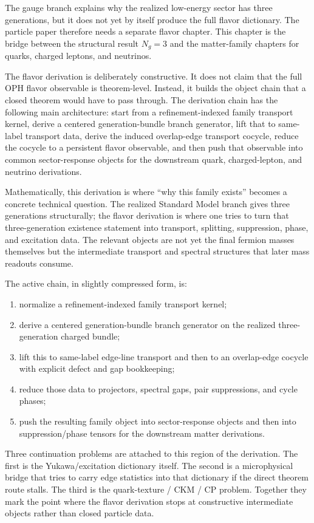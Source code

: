 \documentclass[11pt]{article}
\begin{document}
The gauge branch explains why the realized low-energy sector has three generations, but it does
not yet by itself produce the full flavor dictionary. The particle paper therefore needs a
separate flavor chapter. This chapter is the bridge between the structural result \(N_g=3\) and
the matter-family chapters for quarks, charged leptons, and neutrinos.

The flavor derivation is deliberately constructive. It does not claim that the full
OPH flavor observable is theorem-level. Instead, it builds the object chain that a
closed theorem would have to pass through. The derivation chain has the following main
architecture: start from a refinement-indexed family transport kernel, derive a centered
generation-bundle branch generator, lift that to same-label transport data, derive the induced
overlap-edge transport cocycle, reduce the cocycle to a persistent flavor observable, and then
push that observable into common sector-response objects for the downstream quark, charged-lepton,
and neutrino derivations.

Mathematically, this derivation is where ``why this family exists'' becomes a concrete technical
question. The realized Standard Model branch gives three generations structurally; the flavor
derivation is where one tries to turn that three-generation existence statement into transport,
splitting, suppression, phase, and excitation data. The relevant objects are not yet the final
fermion masses themselves but the intermediate transport and spectral structures that later mass
readouts consume.

The active chain, in slightly compressed form, is:
\begin{enumerate}[leftmargin=2em]
\item normalize a refinement-indexed family transport kernel;
\item derive a centered generation-bundle branch generator on the realized three-generation
charged bundle;
\item lift this to same-label edge-line transport and then to an overlap-edge cocycle with
explicit defect and gap bookkeeping;
\item reduce those data to projectors, spectral gaps, pair suppressions, and cycle phases;
\item push the resulting family object into sector-response objects and then into
suppression/phase tensors for the downstream matter derivations.
\end{enumerate}

Three continuation problems are attached to this region of the derivation. The
first is the Yukawa/excitation dictionary itself. The second is a microphysical bridge that
tries to carry edge statistics into that dictionary if the direct theorem route stalls. The third
is the quark-texture / CKM / CP problem. Together they mark the point where the flavor derivation
stops at constructive intermediate objects rather than closed particle data.
\end{document}
